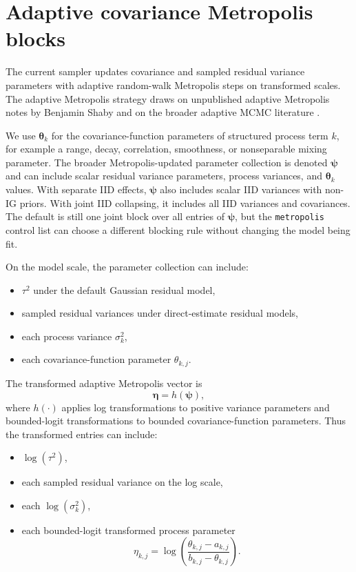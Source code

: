 \documentclass[11pt]{article}
\newcommand{\bpsi}{\bm{\psi}}
\newcommand{\btheta}{\bm{\theta}}
\begin{document}
\section{Adaptive covariance Metropolis blocks}

The current sampler updates covariance and sampled residual variance parameters with adaptive random-walk Metropolis steps on transformed scales. The adaptive Metropolis strategy draws on unpublished adaptive Metropolis notes by Benjamin Shaby and on the broader adaptive MCMC literature \citep{andrieu2008tutorial, Roberts01012009, RobertsRosenthal2007Coupling}.

We use $\btheta_k$ for the covariance-function parameters of structured process term $k$, for example a range, decay, correlation, smoothness, or nonseparable mixing parameter. The broader Metropolis-updated parameter collection is denoted $\bpsi$ and can include scalar residual variance parameters, process variances, and $\btheta_k$ values. With separate IID effects, $\bpsi$ also includes scalar IID variances with non-IG priors. With joint IID collapsing, it includes all IID variances and covariances. The default is still one joint block over all entries of $\bpsi$, but the \texttt{metropolis} control list can choose a different blocking rule without changing the model being fit.

On the model scale, the parameter collection can include:
\begin{itemize}
\item $\tau^2$ under the default Gaussian residual model,
\item sampled residual variances under direct-estimate residual models,
\item each process variance $\sigma_k^2$,
\item each covariance-function parameter $\theta_{k,j}$.
\end{itemize}
The transformed adaptive Metropolis vector is
\begin{equation}
  \boldsymbol{\eta}=h(\bpsi),
\end{equation}
where $h(\cdot)$ applies log transformations to positive variance parameters and bounded-logit transformations to bounded covariance-function parameters. Thus the transformed entries can include:
\begin{itemize}
\item $\log(\tau^2)$,
\item each sampled residual variance on the log scale,
\item each $\log(\sigma_k^2)$,
\item each bounded-logit transformed process parameter \begin{equation} \eta_{k,j} = \log\left(\frac{\theta_{k,j}-a_{k,j}}{b_{k,j}-\theta_{k,j}}\right). \end{equation}
\end{itemize}
\end{document}
